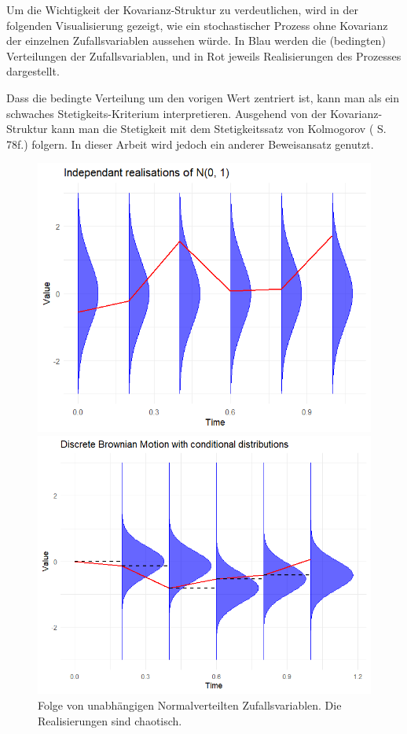 \begin{bem}
Um die Wichtigkeit der Kovarianz-Struktur zu verdeutlichen, wird in der folgenden Visualisierung gezeigt, wie ein
stochastischer Prozess ohne Kovarianz der einzelnen Zufallsvariablen aussehen würde.
In Blau werden die (bedingten) Verteilungen der Zufallsvariablen, und in Rot jeweils Realisierungen des Prozesses dargestellt.

Dass die bedingte Verteilung um den vorigen Wert zentriert ist, kann man als ein schwaches Stetigkeits-Kriterium interpretieren.
Ausgehend von der Kovarianz-Struktur kann man die Stetigkeit mit dem Stetigkeitssatz von Kolmogorov (\cite{behrends} S. 78f.) folgern.
In dieser Arbeit wird jedoch ein anderer Beweisansatz genutzt.

\begin{figure}[H]
  \centering
  \begin{minipage}{0.48\textwidth}
    \includegraphics[width=\textwidth]{images/bb_without_cov.png}
    \caption{Folge von unabhängigen Normalverteilten Zufallsvariablen. Die Realisierungen sind chaotisch.}
    \label{fig:bb_without_cov}
  \end{minipage}\hfill
  \begin{minipage}{0.48\textwidth}
    \includegraphics[width=\textwidth]{images/bb_with_cov.png}

\end{minipage}
\end{figure}
\end{bem}
